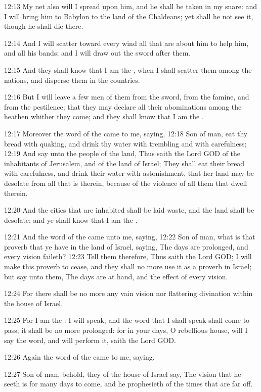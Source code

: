 12:13 My net also will I spread upon him, and he shall be taken in my snare: and I will bring him to Babylon to the land of the Chaldeans; yet shall he not see it, though he shall die there.

12:14 And I will scatter toward every wind all that are about him to help him, and all his bands; and I will draw out the sword after them.

12:15 And they shall know that I am the \LORD, when I shall scatter them among the nations, and disperse them in the countries.

12:16 But I will leave a few men of them from the sword, from the famine, and from the pestilence; that they may declare all their abominations among the heathen whither they come; and they shall know that I am the \LORD.

12:17 Moreover the word of the \LORD came to me, saying, 12:18 Son of man, eat thy bread with quaking, and drink thy water with trembling and with carefulness; 12:19 And say unto the people of the land, Thus saith the Lord GOD of the inhabitants of Jerusalem, and of the land of Israel; They shall eat their bread with carefulness, and drink their water with astonishment, that her land may be desolate from all that is therein, because of the violence of all them that dwell therein.

12:20 And the cities that are inhabited shall be laid waste, and the land shall be desolate; and ye shall know that I am the \LORD.

12:21 And the word of the \LORD came unto me, saying, 12:22 Son of man, what is that proverb that ye have in the land of Israel, saying, The days are prolonged, and every vision faileth?  12:23 Tell them therefore, Thus saith the Lord GOD; I will make this proverb to cease, and they shall no more use it as a proverb in Israel; but say unto them, The days are at hand, and the effect of every vision.

12:24 For there shall be no more any vain vision nor flattering divination within the house of Israel.

12:25 For I am the \LORD: I will speak, and the word that I shall speak shall come to pass; it shall be no more prolonged: for in your days, O rebellious house, will I say the word, and will perform it, saith the Lord GOD.

12:26 Again the word of the \LORD came to me, saying.

12:27 Son of man, behold, they of the house of Israel say, The vision that he seeth is for many days to come, and he prophesieth of the times that are far off.

